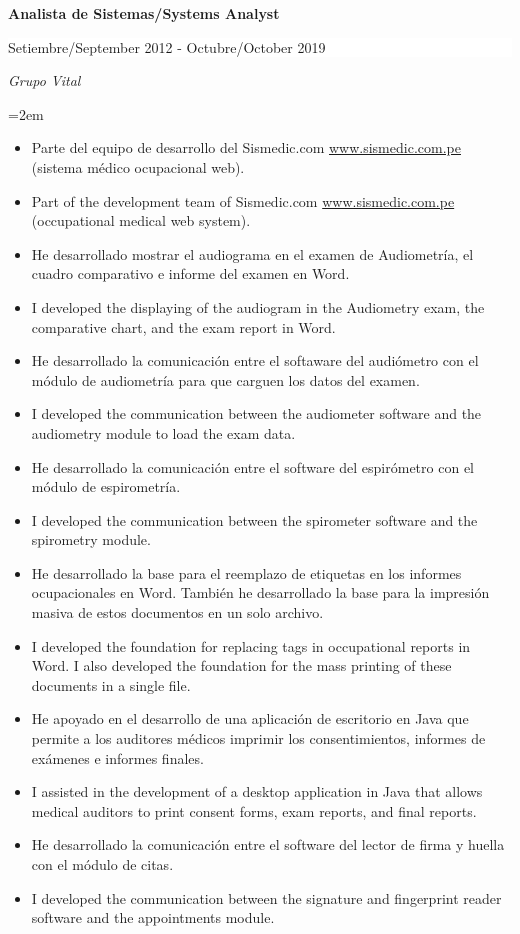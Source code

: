 \documentclass[paper=a4,fontsize=11pt]{scrartcl} %
\newcommand{\sepspace}{\vspace*{1em}}		%
\newcommand{\EducationEntry}[4]{
		\noindent \textbf{#1} \hfill      %
		\colorbox{White}{%
			\parbox{7cm}{%
			\hfill\color{Black}#2}} \par  %
		\noindent \textit{#3} \par        %
		\noindent\hangindent=2em\hangafter=0 \small #4 %
		\normalsize \par}
\begin{document}
\EducationEntry{Analista de Sistemas/Systems Analyst}{Setiembre/September 2012 - Octubre/October 2019}{Grupo Vital}{
\begin{itemize}
\item{Parte del equipo de desarrollo del Sismedic.com \url{www.sismedic.com.pe} (sistema médico ocupacional web).}
\item{Part of the development team of Sismedic.com \url{www.sismedic.com.pe} (occupational medical web system).}
\item{He desarrollado mostrar el audiograma en el examen de Audiometría, el cuadro comparativo e informe del examen en Word.}
\item{I developed the displaying of the audiogram in the Audiometry exam, the comparative chart, and the exam report in Word.}
\item{He desarrollado la comunicación entre el softaware del audiómetro con el módulo de audiometría para que carguen los datos del examen.}
\item{I developed the communication between the audiometer software and the audiometry module to load the exam data.}
\item{He desarrollado la comunicación entre el software del espirómetro con el módulo de espirometría.}
\item{I developed the communication between the spirometer software and the spirometry module.}
\item{He desarrollado la base para el reemplazo de etiquetas en los informes ocupacionales en Word. También he desarrollado la base para la impresión masiva de estos documentos en un solo archivo.}
\item{I developed the foundation for replacing tags in occupational reports in Word. I also developed the foundation for the mass printing of these documents in a single file.}
\item{He apoyado en el desarrollo de una aplicación de escritorio en Java que permite a los auditores médicos imprimir los consentimientos, informes de exámenes e informes finales.}
\item{I assisted in the development of a desktop application in Java that allows medical auditors to print consent forms, exam reports, and final reports.}
\item{He desarrollado la comunicación entre el software del lector de firma y huella con el módulo de citas.}
\item{I developed the communication between the signature and fingerprint reader software and the appointments module.}
\end{itemize}
}
\sepspace
\end{document}
